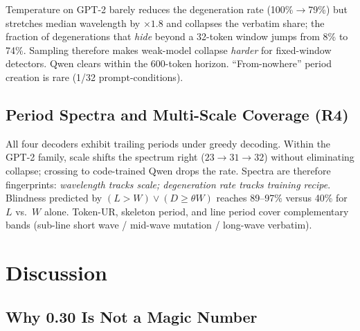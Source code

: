 \documentclass[11pt]{article}
\begin{document}
Temperature on GPT-2 barely reduces the degeneration rate (100\%$\to$79\%) but stretches median wavelength by $\times 1.8$ and collapses the verbatim share; the fraction of degenerations that \emph{hide} beyond a 32-token window jumps from 8\% to 74\%. Sampling therefore makes weak-model collapse \emph{harder} for fixed-window detectors. Qwen clears within the 600-token horizon. ``From-nowhere'' period creation is rare (1/32 prompt-conditions).

\subsection{Period Spectra and Multi-Scale Coverage (R4)}
\label{sec:r4}

\begin{table}[t]
\centering
\caption{Greedy spectra and two-factor rule. Rule~1 uses only $L$ vs.\ $W$; Rule~2 adds $D$ (floor law).}
\label{tab:r4-spectrum}
\end{table}

All four decoders exhibit trailing periods under greedy decoding. Within the GPT-2 family, scale shifts the spectrum right ($23\to31\to32$) without eliminating collapse; crossing to code-trained Qwen drops the rate. Spectra are therefore fingerprints: \emph{wavelength tracks scale; degeneration rate tracks training recipe}. Blindness predicted by $(L>W)\lor(D\ge\theta W)$ reaches 89--97\% versus 40\% for $L$ vs.\ $W$ alone. Token-UR, skeleton period, and line period cover complementary bands (sub-line short wave / mid-wave mutation / long-wave verbatim).

\section{Discussion}

\subsection{Why 0.30 Is Not a Magic Number}
\end{document}
